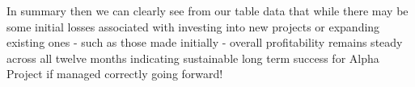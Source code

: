  In summary then we can clearly see from our table data that while there may be some initial losses associated with investing into new projects or expanding existing ones - such as those made initially - overall profitability remains steady across all twelve months indicating sustainable long term success for Alpha Project if managed correctly going forward!